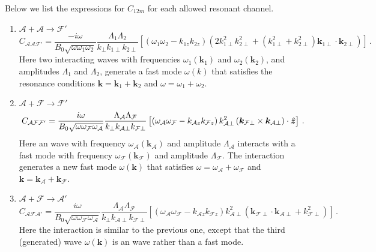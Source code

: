 Below we list the expressions for $C_{12m}$ for each allowed resonant channel.
\begin{enumerate}
	\item $\mathcal{A}+\mathcal{A}\rightarrow\mathcal{F}'$
	\begin{equation}
C_{\mathcal{A}\mathcal{A}\mathcal{F}'}=\frac{-i \omega}{B_0\sqrt{\omega \omega_1\omega_2}} \frac{\Lambda_1\Lambda_2}{k_{\perp}k_{1\perp}k_{2\perp}}\left[\left( \omega_1\omega_2 - k_{1z}k_{2z} \right) \left(2k_{1\perp}^2k_{2\perp}^2 + (k_{1\perp}^2+k_{2\perp}^2)\boldsymbol{k}_{1\perp}\cdot \boldsymbol{
	k}_{2\perp} \right)\right]\, .
	\end{equation}
Here two interacting \alfven waves with frequencies $\omega_1(\boldsymbol{k}_1)$ and $\omega_2(\boldsymbol{k}_2)$, and amplitudes $\Lambda_1$ and $\Lambda_2$, generate a fast mode $\omega(k)$ that satisfies the resonance conditions $\boldsymbol{k}=\boldsymbol{k}_1+\boldsymbol{k}_2$ and $\omega=\omega_1+\omega_2$.

	\item $\mathcal{A}+\mathcal{F}\rightarrow\mathcal{F}'$
	\begin{equation}
    C_{\mathcal{A}\mathcal{F}\mathcal{F}'}=\frac{ i \omega}{B_0\sqrt{\omega \omega_\mathcal{F}\omega_\mathcal{A}}} \frac{\Lambda_{\mathcal{A}}\Lambda_{\mathcal{F}}}{k_{\perp}k_{\mathcal{A}\perp}k_{\mathcal{F}\perp}}\left[\left( \omega_\mathcal{A}\omega_\mathcal{F} - k_{\mathcal{A}z}k_{\mathcal{F}z} \right) k_{\mathcal{A}\perp}^2\left( \boldsymbol{k}_{\mathcal{F}\perp}\times \boldsymbol{k}_{\mathcal{A}\perp} \right)\cdot\hat{\boldsymbol{z}} \right]\, .
	\end{equation}
Here an \alfven wave with frequency $\omega_{\mathcal{A}}(\boldsymbol{k}_{\mathcal{A}})$ and amplitude $\Lambda_{\mathcal{A}}$ interacts with a fast mode with frequency $\omega_{\mathcal{F}}(\boldsymbol{k}_{\mathcal{F}})$ and amplitude $\Lambda_{\mathcal{F}}$. The interaction generates a new fast mode $\omega(\boldsymbol{k})$ that satisfies $\omega=\omega_{\mathcal{A}}+\omega_{\mathcal{F}}$ and $\boldsymbol{k}=\boldsymbol{k}_{\mathcal{A}}+\boldsymbol{k}_{\mathcal{F}}$.
	 
    \item $\mathcal{A}+\mathcal{F}\rightarrow\mathcal{A}'$
	\begin{equation}
    C_{\mathcal{A}\mathcal{F}\mathcal{A}'}=\frac{ i \omega}{B_0\sqrt{\omega \omega_\mathcal{F}\omega_\mathcal{A}}} \frac{\Lambda_{\mathcal{A}}\Lambda_{\mathcal{F}}}{k_{\perp}k_{\mathcal{A}\perp}k_{\mathcal{F}\perp}}\left[\left( \omega_\mathcal{A}\omega_\mathcal{F} - k_{\mathcal{A}z}k_{\mathcal{F}z} \right) k_{\mathcal{A}\perp}^2\left( \boldsymbol{k}_{\mathcal{F}\perp}\cdot \boldsymbol{k}_{\mathcal{A}\perp} + k^2_{\mathcal{F}\perp} \right) \right]\, .
	\end{equation}
Here the interaction is similar to the previous one, except that the third (generated) wave $\omega(\boldsymbol{k})$ is an \alfven wave rather than a fast mode.
\end{enumerate}

